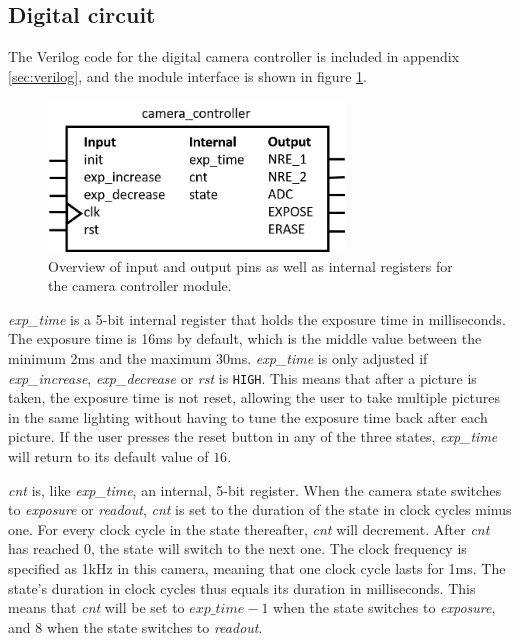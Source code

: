 \subsection{Digital circuit}

The Verilog code for the digital camera controller is included in appendix \ref{sec:verilog}, and the module interface is shown in figure \ref{fig:digitalModule}.

\begin{figure}[H]
    \centering
    \includegraphics[width=0.7\textwidth]{graphs/camera_controller_pinout_with_internal.png}
    \caption{Overview of input and output pins as well as internal registers for the camera controller module.}
    \label{fig:digitalModule}
\end{figure}

\emph{exp\_time} is a 5-bit internal register that holds the exposure time in milliseconds. The exposure time is 16ms by default, which is the middle value between the minimum 2ms and the maximum 30ms. \emph{exp\_time} is only adjusted if \emph{exp\_increase}, \emph{exp\_decrease} or \emph{rst} is \verb|HIGH|. This means that after a picture is taken, the exposure time is not reset, allowing the user to take multiple pictures in the same lighting without having to tune the exposure time back after each picture. If the user presses the reset button in any of the three states, \emph{exp\_time} will return to its default value of $16$.

\emph{cnt} is, like \emph{exp\_time}, an internal, 5-bit register. When the camera state switches to \emph{exposure} or \emph{readout}, \emph{cnt} is set to the duration of the state in clock cycles minus one. For every clock cycle in the state thereafter, \emph{cnt} will decrement. After \emph{cnt} has reached $0$, the state will switch to the next one. The clock frequency is specified as 1kHz in this camera, meaning that one clock cycle lasts for 1ms. The state's duration in clock cycles thus equals its duration in milliseconds. This means that \emph{cnt} will be set to $exp\_time - 1$ when the state switches to \emph{exposure}, and $8$ when the state switches to \emph{readout}.


